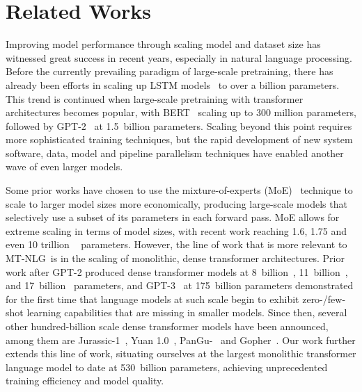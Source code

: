 \documentclass[11pt]{article}
\newcommand{\ours}{MT-NLG}
\begin{document}
\section{Related Works}




Improving model performance through scaling model and dataset size has witnessed great success in recent years, especially in natural language processing. Before the currently prevailing paradigm of large-scale pretraining, there has already been efforts in scaling up LSTM models~\citep{Jzefowicz2016ExploringTL} to over a billion parameters. This trend is continued when large-scale pretraining with transformer architectures becomes popular, with BERT~\citep{Devlin2019BERTPO} scaling up to 300 million parameters, followed by GPT-2~\citep{gpt2-radford2019language} at 1.5~billion parameters. Scaling beyond this point requires more sophisticated training techniques, but the rapid development of new system software, data, model and pipeline parallelism techniques have enabled another wave of even larger models. 

Some prior works have chosen to use the mixture-of-experts (MoE)~\citep{Lepikhin2021GShardSG,Lin2021M6AC,Shazeer2017OutrageouslyLN} technique to scale to larger model sizes more economically, producing large-scale models that selectively use a subset of its parameters in each forward pass. MoE allows for extreme scaling in terms of model sizes, with recent work reaching 1.6, 1.75
and even 10 trillion ~\citep{wudao2p0,Fedus2021SwitchTS,Lin2021M610TAS} parameters. However, the line of work that is more relevant to \ours~is in the scaling of monolithic, dense transformer architectures. Prior work after GPT-2 produced dense transformer models at 8~billion~\citep{megatron-DBLP:journals/corr/abs-1909-08053}, 11~billion~\citep{t5}, and 17~billion~\citep{tnlg17b} parameters, and GPT-3~\citep{brown2020language} at 175~billion parameters demonstrated for the first time that language models at such scale begin to exhibit zero-/few-shot learning capabilities that are missing in smaller models. Since then, several other hundred-billion scale dense transformer models have been announced, among them are Jurassic-1~\citep{lieber_sharir_lenz_shoham}, Yuan 1.0~\citep{Wu2021Yuan}, PanGu-~\citep{Zeng2021PanGuLA} and Gopher~\citep{Rae2021Gopher}.
Our work further extends this line of work, situating ourselves at the largest monolithic transformer language model to date at 530~billion parameters, achieving unprecedented training efficiency and model quality.
\end{document}
